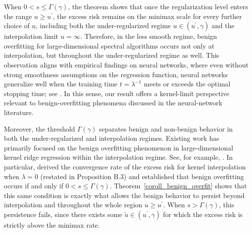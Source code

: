 \documentclass{article}
\theoremstyle{plain}
\theoremstyle{definition}
\theoremstyle{remark}
\begin{document}
When $0 < s \le \Gamma(\gamma)$, the theorem shows that once the regularization level enters the range $u \ge u^{\prime}$, the excess risk remains on the minimax scale for every further choice of $u$, including both the under-regularized regime $u \in (u^{\prime},\gamma)$ and the interpolation limit $u=\infty$. 
Therefore, in the less smooth regime, benign overfitting for large-dimensional spectral algorithms occurs not only at interpolation, but throughout the under-regularized regime as well. 
This observation aligns with empirical findings on neural networks, where even without strong smoothness assumptions on the regression function, neural networks generalize well when the training time $t = \lambda^{-1}$ meets or exceeds the optimal stopping time; see \cite{zhang2021understanding, zhang2016understanding, belkin2018understand, belkin2019does, belkin2021fit, nakkiran2021deep}.
In this sense, our result offers a kernel-limit perspective relevant to benign-overfitting phenomena discussed in the neural-network literature.



Moreover, the threshold $\Gamma(\gamma)$ separates benign and non-benign behavior in both the under-regularized and interpolation regimes.
Existing work has primarily focused on the benign overfitting phenomenon in large-dimensional kernel ridge regression within the interpolation regime. 
See, for example, \cite{Liang_Just_2019, liang2020multiple, aerni2023strong, barzilai2023generalization, zhang2024phase}.
In particular, \cite{zhang2024phase} derived the convergence rate of the excess risk for kernel interpolation when $\lambda=0$ (restated in Proposition B.3) and established that benign overfitting occurs if and only if $0 < s \leq \Gamma(\gamma)$. 
Theorem~\ref{coroll_benign_overfit} shows that this same condition is exactly what allows the benign behavior to persist beyond interpolation and throughout the whole region $u \geq u^{\prime}$. When $s > \Gamma(\gamma)$, this persistence fails, since there exists some $\tilde u \in (u^{\prime},\gamma)$ for which the excess risk is strictly above the minimax rate.
\end{document}
